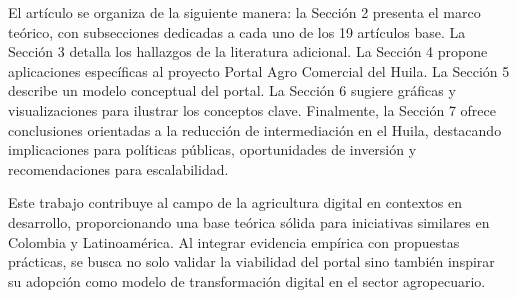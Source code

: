 El artículo se organiza de la siguiente manera: la Sección 2 presenta el marco teórico, con subsecciones dedicadas a cada uno de los 19 artículos base. La Sección 3 detalla los hallazgos de la literatura adicional. La Sección 4 propone aplicaciones específicas al proyecto Portal Agro Comercial del Huila. La Sección 5 describe un modelo conceptual del portal. La Sección 6 sugiere gráficas y visualizaciones para ilustrar los conceptos clave. Finalmente, la Sección 7 ofrece conclusiones orientadas a la reducción de intermediación en el Huila, destacando implicaciones para políticas públicas, oportunidades de inversión y recomendaciones para escalabilidad.

Este trabajo contribuye al campo de la agricultura digital en contextos en desarrollo, proporcionando una base teórica sólida para iniciativas similares en Colombia y Latinoamérica. Al integrar evidencia empírica con propuestas prácticas, se busca no solo validar la viabilidad del portal sino también inspirar su adopción como modelo de transformación digital en el sector agropecuario.